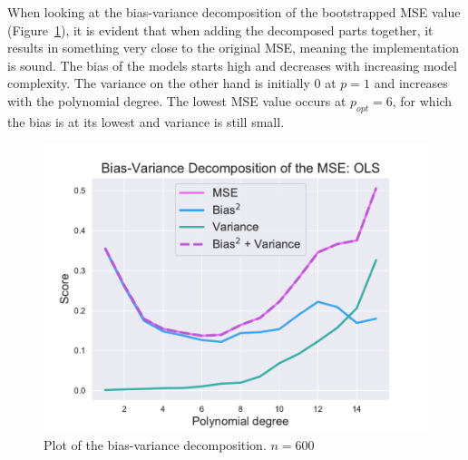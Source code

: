 \documentclass[twocolumn,english,notitlepage]{article}
\begin{document}
            When looking at the bias-variance decomposition of the bootstrapped MSE value (Figure~\ref{res:fig:bs_OLS_bias_variance_tradeoff_ols}), it is evident that when adding the decomposed parts together, it results in something very close to the original MSE, meaning the implementation is sound. The bias of the models starts high and decreases with increasing model complexity. The variance on the other hand is initially $0$ at $p=1$ and increases with the polynomial degree. The lowest MSE value occurs at $p_{opt}=6$, for which the bias is at its lowest and variance is still small. 
            \begin{figure}[ht]
                \centering
                \includegraphics[width=.9\linewidth]{BS_Bias_var_decomp_OLS.pdf}
                \caption{Plot of the bias-variance decomposition. $n=600$ }
                \label{res:fig:bs_OLS_bias_variance_tradeoff_ols}
            \end{figure}
\end{document}
